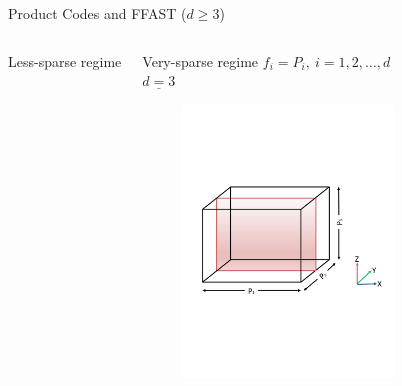 \documentclass[10pt,xcolor=table]{beamer}
\begin{document}
\begin{frame}{Product Codes and FFAST ($d \geq 3$)}
\begin{columns}
\begin{block}{Less-sparse regime}
		\end{block}
		\begin{block}{Very-sparse regime}
			\color{red} $f_i= P_i,\ i=1,2, \ldots,d$\\ \vspace{0.2in}
			\vspace{-2mm}
			\color{blue} $\underline{d=3}$
			\vspace{-3mm}
			\begin{figure}[t]
				\centering
				\includegraphics[width=2.2in]{./Figures/very-sparse}
			\end{figure}
			
		\end{block}
	\end{columns}
		
		
	\end{frame}
\end{document}
